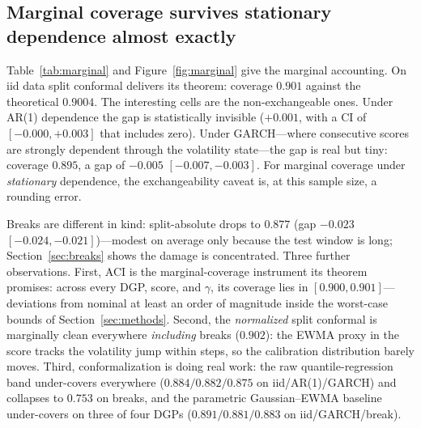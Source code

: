 \documentclass[11pt]{article}
\begin{document}
\subsection{Marginal coverage survives stationary dependence almost exactly}
\label{sec:marginal}

Table~\ref{tab:marginal} and Figure~\ref{fig:marginal} give the marginal
accounting. On iid data split conformal delivers its theorem: coverage
$0.901$ against the theoretical $0.9004$. The interesting cells are the
non-exchangeable ones. Under AR(1) dependence the gap is statistically
invisible ($+0.001$, with a CI of $[-0.000,+0.003]$ that includes zero). Under GARCH---where consecutive
scores are strongly dependent through the volatility state---the gap is real
but tiny: coverage $0.895$, a gap of $-0.005$ $[-0.007,-0.003]$. For marginal
coverage under \emph{stationary} dependence, the exchangeability caveat is, at
this sample size, a rounding error.

Breaks are different in kind: split-absolute drops to $0.877$ (gap $-0.023$
$[-0.024,-0.021]$)---modest on average only because the test window is long;
Section~\ref{sec:breaks} shows the damage is concentrated. Three further
observations. First, ACI is the marginal-coverage instrument its theorem
promises: across every DGP, score, and $\gamma$, its coverage lies in
$[0.900,0.901]$---deviations from nominal at least an order of magnitude
inside the worst-case bounds of Section~\ref{sec:methods}. Second, the
\emph{normalized} split conformal is marginally clean everywhere
\emph{including} breaks ($0.902$): the EWMA proxy in the score tracks the
volatility jump within steps, so the calibration distribution barely moves.
Third, conformalization is doing real work: the raw quantile-regression band
under-covers everywhere ($0.884/0.882/0.875$ on iid/AR(1)/GARCH) and collapses
to $0.753$ on breaks, and the parametric Gaussian--EWMA baseline under-covers
on three of four DGPs ($0.891/0.881/0.883$ on iid/GARCH/break).
\end{document}
